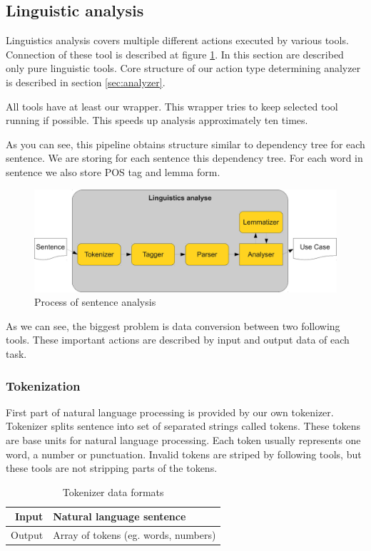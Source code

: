 \subsection{Linguistic analysis}
\label{sec:analysis}
Linguistics analysis covers multiple different actions executed by various tools. Connection of these tool is described at figure \ref{fig:LinguisticsAnalyse}. In this section are described only pure linguistic tools. Core structure of our action type determining analyzer is described in section \ref{sec:analyzer}.

All tools have at least our wrapper. This wrapper tries to keep selected tool running if possible. This speeds up analysis approximately ten times.

As you can see, this pipeline obtains structure similar to dependency tree for each sentence. We are storing for each sentence this dependency tree. For each word in sentence we also store POS tag and lemma form.

\begin{figure}[ht]
  \centering
  \includegraphics[width=400pt]{images/LinguisticsAnalyse}
  \caption{Process of sentence analysis}
  \label{fig:LinguisticsAnalyse}
\end{figure}

As we can see, the biggest problem is data conversion between two following tools. These important actions are described by input and output data of each task.

\subsubsection{Tokenization}
First part of natural language processing is provided by our own tokenizer. Tokenizer splits sentence into set of separated strings called tokens. These tokens are base units for natural language processing. Each token usually represents one word, a number or punctuation. Invalid tokens are striped by following tools, but these tools are not stripping parts of the tokens.

\begin{table}[ht]   %
\begin{center}
  \begin{tabular}{| r | l |}
\hline
Input 	&	Natural language sentence \\ \hline
Output &	Array of tokens (eg. words, numbers) \\ 
\hline
  \end{tabular}
  \caption{Tokenizer data formats}
  \label{tab.tokenization}
\end{center}
\end{table} 

